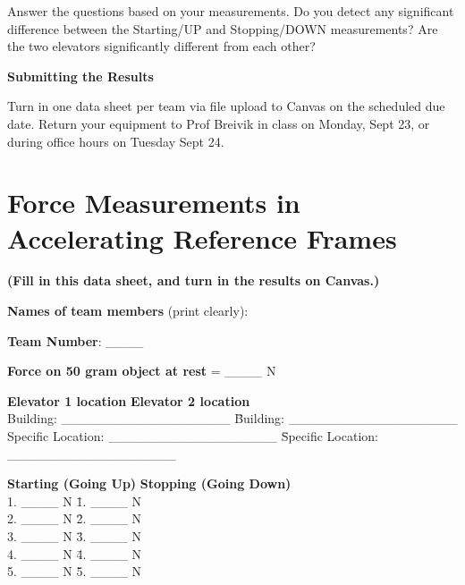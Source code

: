 \documentclass[12pt]{article}
\begin{document}
\noindent Answer the questions based on your measurements. Do you detect any
significant difference between the Starting/UP and Stopping/DOWN measurements?
Are the two elevators significantly different from each other?

\vspace{0.5cm}
{\bf{\noindent Submitting the Results}}

\noindent Turn in one data sheet per team via file upload to Canvas on the
scheduled due date. Return your equipment to Prof Breivik in class on Monday,
Sept 23, or during office hours on Tuesday Sept 24. 

\newpage

\section*{\noindent Force Measurements in Accelerating Reference Frames}

\textbf{(Fill in this data sheet, and turn in the results on Canvas.)}

\vspace{0.5cm}
\noindent \textbf{Names of team members} (print clearly):

\vspace{0.5cm}
\noindent \textbf{Team Number}: \_\_\_\_

\vspace{0.5cm}
\noindent \textbf{Force on 50 gram object at rest} = \_\_\_\_ N

\begin{tabbing}
\textbf{Elevator 1 location} \hspace{2.5cm} \= \textbf{Elevator
2 location} \\
Building: \_\_\_\_\_\_\_\_\_\_\_\_\_\_\_\_\_\_ \hspace{2cm} \= Building: \_\_\_\_\_\_\_\_\_\_\_\_\_\_\_\_\_\_ \\
Specific Location: \_\_\_\_\_\_\_\_\_\_\_\_\_\_\_\_\_\_ \hspace{2cm} \= Specific Location: \_\_\_\_\_\_\_\_\_\_\_\_\_\_\_\_\_\_
\end{tabbing}

\vspace{0.5cm}

\begin{tabbing}
\textbf{Starting (Going Up)} \hspace{2cm} \= \textbf{Stopping
(Going Down)} \\
1. \_\_\_\_ N \hspace{4cm} \= 1. \_\_\_\_ N \\
2. \_\_\_\_ N \hspace{4cm} \= 2. \_\_\_\_ N \\
3. \_\_\_\_ N \hspace{4cm} \= 3. \_\_\_\_ N \\
4. \_\_\_\_ N \hspace{4cm} \= 4. \_\_\_\_ N \\
5. \_\_\_\_ N \hspace{4cm} \= 5. \_\_\_\_ N \\
\end{tabbing}
\end{document}
